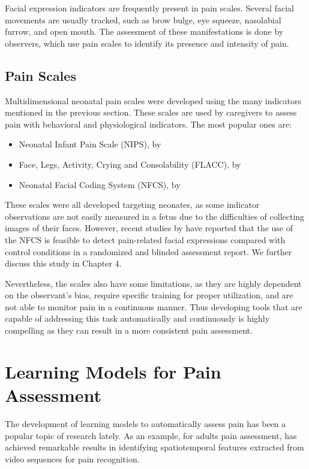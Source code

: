 Facial expression indicators are frequently present in pain scales. Several facial movements are usually tracked, such as brow bulge, eye squeeze, nasolabial furrow, and open mouth. The assessment of these manifestations is done by observers, which use pain scales to identify its presence and intensity of pain.

\subsection{Pain Scales}

Multidimensional neonatal pain scales were developed using the many indicators mentioned in the previous section. These scales are used by caregivers to assess pain with behavioral and physiological indicators. The most popular ones are:

\begin{itemize}
    \item Neonatal Infant Pain Scale (NIPS), by \cite{Lawrence1993}
    \item Face, Legs, Activity, Crying and Consolability (FLACC), by \cite{Merkel1996}
    \item Neonatal Facial Coding System (NFCS), by \cite{Grunau1998}
\end{itemize}

These scales were all developed targeting neonates, as some indicator observations are not easily measured in a fetus due to the difficulties of collecting images of their faces. However, recent studies by \cite{bernardes2018feasibility} have reported that the use of the NFCS is feasible to detect pain-related facial expressions compared with control conditions in a randomized and blinded assessment report. We further discuss this study in Chapter 4.

Nevertheless, the scales also have some limitations, as they are highly dependent on the observant's bias, require specific training for proper utilization, and are not able to monitor pain in a continuous manner. Thus developing tools that are capable of addressing this task automatically and continuously is highly compelling as they can result in a more consistent pain assessment.

\section{Learning Models for Pain Assessment}

The development of learning models to automatically assess pain has been a popular topic of research lately. As an example, for adults pain assessment, \citep{MauricioCVC19} has achieved remarkable results in identifying spatiotemporal features extracted from video sequences for pain recognition.

